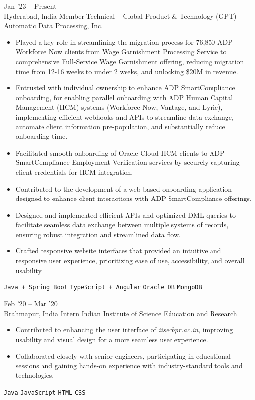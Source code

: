 \documentclass[9pt]{util} %
\begin{document}
\vspace{-10 pt}

\begin{entrylist}
	\entry
	{{Jan '23 -- Present} \\\footnotesize{Hyderabad, India}}
	{Member Technical -- Global Product \& Technology (GPT)}
	{Automatic Data Processing, Inc.}
	{\vspace{-10pt}
		\begin{itemize}[noitemsep,topsep=0pt,parsep=0pt,partopsep=0pt, leftmargin=-1pt]
            \item Played a key role in streamlining the migration process for 76,850 ADP Workforce Now clients from Wage Garnishment Processing Service to comprehensive Full-Service Wage Garnishment offering, reducing migration time from 12-16 weeks to under 2 weeks, and unlocking \$20M in revenue.
            \item Entrusted with individual ownership to enhance ADP SmartCompliance onboarding, for enabling parallel onboarding with ADP Human Capital Management (HCM) systems (Workforce Now, Vantage, and Lyric), implementing efficient webhooks and APIs to streamline data exchange, automate client information pre-population, and substantially reduce onboarding time.
            \item Facilitated smooth onboarding of Oracle Cloud HCM clients to ADP SmartCompliance Employment Verification services by securely capturing client credentials for HCM integration.
			\item Contributed to the development of a web-based onboarding application designed to enhance client interactions with ADP SmartCompliance offerings.
			\item Designed and implemented efficient APIs and optimized DML queries to facilitate seamless data exchange between multiple systems of records, ensuring robust integration and streamlined data flow.
			\item Crafted responsive website interfaces that provided an intuitive and responsive user experience, prioritizing ease of use, accessibility, and overall usability.
		\end{itemize}
		\texttt{Java + Spring Boot} \slashsep \texttt{TypeScript + Angular} \slashsep \texttt{Oracle DB} \slashsep \texttt{MongoDB}}
	\entry
	{{Feb '20 -- Mar '20} \\\footnotesize{Brahmapur, India}}
	{Intern}
	{Indian Institute of Science Education and Research}
	{\vspace{-10pt}
		\begin{itemize}[noitemsep,topsep=0pt,parsep=0pt,partopsep=0pt, leftmargin=-1pt]
			\item Contributed to enhancing the user interface of \textit{iiserbpr.ac.in}, improving usability and visual design for a more seamless user experience.
			\item Collaborated closely with senior engineers, participating in educational sessions and gaining hands-on experience with industry-standard tools and technologies.
		\end{itemize}
		\texttt{Java} \slashsep \texttt{JavaScript} \slashsep \texttt{HTML} \slashsep \texttt{CSS}}
\end{entrylist}
\end{document}
